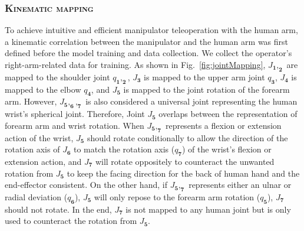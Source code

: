 \subsubsection{\textbf{\textsc{Kinematic mapping}}}
To achieve intuitive and efficient manipulator teleoperation with the human arm, a kinematic correlation between the manipulator and the human arm was first defined before the model training and data collection.  We collect the operator's right-arm-related data for training. As shown in Fig.~\ref{fig:jointMapping}, $\mathbf{\textit{J}_1,_2}$ are mapped to the shoulder joint $\mathbf{\textit{q}_1,_2}$, $\mathbf{\textit{J}_3}$ is mapped to the upper arm joint $\mathbf{\textit{q}_3}$, $\mathbf{\textit{J}_4}$ is mapped to the elbow $\mathbf{\textit{q}_4}$, and $\mathbf{\textit{J}_5}$ is mapped to the joint rotation of the forearm arm. However, $\mathbf{\textit{J}_5,_6,_7}$ is also considered a universal joint representing the human wrist's spherical joint. Therefore, Joint $\mathbf{\textit{J}_5}$ overlaps between the representation of forearm arm and wrist rotation. When $\mathbf{\textit{J}_5,_7}$ represents a flexion or extension action of the wrist, $\mathbf{\textit{J}_5}$ should rotate conditionally to allow the direction of the rotation axis of $\mathbf{\textit{J}_6}$ to match the rotation axis ($\mathbf{\textit{q}_7}$) of the wrist's flexion or extension action, and $\mathbf{\textit{J}_7}$ will rotate oppositely to counteract the unwanted rotation from $\mathbf{\textit{J}_5}$ to keep the facing direction for the back of human hand and the end-effector consistent. On the other hand, if $\mathbf{\textit{J}_5,_7}$ represents either an ulnar or radial deviation ($\mathbf{\textit{q}_6}$), $\mathbf{\textit{J}_5}$ will only repose to the forearm arm rotation ($\mathbf{\textit{q}_5}$), $\mathbf{\textit{J}_7}$ should not rotate. In the end, $\mathbf{\textit{J}_7}$ is not mapped to any human joint but is only used to counteract the rotation from $\mathbf{\textit{J}_5}$. 


